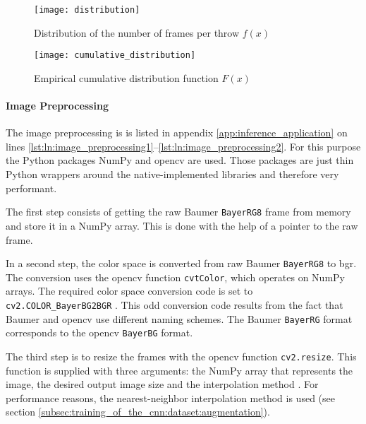 \begin{figure}
  \centering
  \texttt{[image: distribution]}
  \caption{Distribution of the number of frames per throw $f(x)$}
  \label{fig:distribution}
\end{figure}

\begin{figure}
  \centering
  \texttt{[image: cumulative\_distribution]}
  \caption{Empirical cumulative distribution function $F(x)$}
  \label{fig:cumulative_distribution}
\end{figure}

\paragraph{Image Preprocessing}
The image preprocessing is is listed in appendix \ref{app:inference_application} on lines \ref{lst:ln:image_preprocessing1}--\ref{lst:ln:image_preprocessing2}.
For this purpose the Python packages NumPy and \acrshort{opencv} are used.
Those packages are just thin Python wrappers around the native-implemented libraries and therefore very performant.

The first step consists of getting the raw Baumer \texttt{BayerRG8} frame from memory and store it in a NumPy array.
This is done with the help of a pointer to the raw frame.

In a second step, the color space is converted from raw Baumer \texttt{BayerRG8} to \acrshort{bgr}.
The conversion uses the \acrshort{opencv} function \texttt{cvtColor}, which operates on NumPy arrays.
The required color space conversion code is set to \texttt{cv2.COLOR\_BayerBG2BGR} \cite{inf_opencv_color}.
This odd conversion code results from the fact that Baumer and \acrshort{opencv} use different naming schemes.
The Baumer \texttt{BayerRG} format corresponds to the \acrshort{opencv} \texttt{BayerBG} format.

The third step is to resize the frames with the \acrshort{opencv} function \texttt{cv2.resize}.
This function is supplied with three arguments: the NumPy array that represents the image, the desired output image size and the interpolation method \cite{training_opencv_resize}.
For performance reasons, the nearest-neighbor interpolation method is used (see section \ref{subsec:training_of_the_cnn:dataset:augmentation}).

